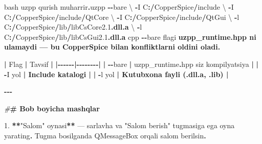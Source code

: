 \documentclass[a4paper,11pt,twoside,openright]{book}
\newenvironment{Shaded}{\begin{snugshade}}{\end{snugshade}}
\newcommand{\CharTok}[1]{\textcolor[rgb]{0.31,0.60,0.02}{#1}}
\newcommand{\ErrorTok}[1]{\textcolor[rgb]{0.64,0.00,0.00}{\textbf{#1}}}
\newcommand{\FloatTok}[1]{\textcolor[rgb]{0.00,0.00,0.81}{#1}}
\newcommand{\NormalTok}[1]{#1}
\newcommand{\OperatorTok}[1]{\textcolor[rgb]{0.81,0.36,0.00}{\textbf{#1}}}
\newcommand{\PreprocessorTok}[1]{\textcolor[rgb]{0.56,0.35,0.01}{\textit{#1}}}
\newcommand{\StringTok}[1]{\textcolor[rgb]{0.31,0.60,0.02}{#1}}
\begin{document}
\begin{Shaded}
\begin{Highlighting}[]
\ErrorTok{\textasciigrave{}\textasciigrave{}\textasciigrave{}}\NormalTok{bash}
\NormalTok{uzpp qurish muharrir}\OperatorTok{.}\NormalTok{uzpp }\OperatorTok{{-}{-}}\NormalTok{bare \textbackslash{}}
  \OperatorTok{{-}}\NormalTok{I C}\OperatorTok{:/}\NormalTok{CopperSpice}\OperatorTok{/}\NormalTok{include \textbackslash{}}
  \OperatorTok{{-}}\NormalTok{I C}\OperatorTok{:/}\NormalTok{CopperSpice}\OperatorTok{/}\NormalTok{include}\OperatorTok{/}\NormalTok{QtCore \textbackslash{}}
  \OperatorTok{{-}}\NormalTok{I C}\OperatorTok{:/}\NormalTok{CopperSpice}\OperatorTok{/}\NormalTok{include}\OperatorTok{/}\NormalTok{QtGui \textbackslash{}}
  \OperatorTok{{-}}\NormalTok{l C}\OperatorTok{:/}\NormalTok{CopperSpice}\OperatorTok{/}\NormalTok{lib}\OperatorTok{/}\NormalTok{libCsCore2}\FloatTok{.1}\ErrorTok{.dll.a}\NormalTok{ \textbackslash{}}
  \OperatorTok{{-}}\NormalTok{l C}\OperatorTok{:/}\NormalTok{CopperSpice}\OperatorTok{/}\NormalTok{lib}\OperatorTok{/}\NormalTok{libCsGui2}\FloatTok{.1}\ErrorTok{.dll.a}
\ErrorTok{\textasciigrave{}\textasciigrave{}\textasciigrave{}}\NormalTok{cpp}
\ErrorTok{\textasciigrave{}}\OperatorTok{{-}{-}}\NormalTok{bare}\ErrorTok{\textasciigrave{}}\NormalTok{ flag}\CharTok{\textquotesingle{}i}\ErrorTok{ \textasciigrave{}uzpp\_runtime.hpp\textasciigrave{} ni ulamaydi — bu CopperSpice bilan konfliktlarni oldini oladi.}

\OperatorTok{|}\NormalTok{ Flag }\OperatorTok{|}\NormalTok{ Tavsif }\OperatorTok{|}
\OperatorTok{|{-}{-}{-}{-}{-}{-}|{-}{-}{-}{-}{-}{-}{-}{-}|}
\OperatorTok{|} \ErrorTok{\textasciigrave{}}\OperatorTok{{-}{-}}\NormalTok{bare}\ErrorTok{\textasciigrave{}} \OperatorTok{|} \ErrorTok{\textasciigrave{}}\NormalTok{uzpp\_runtime}\OperatorTok{.}\NormalTok{hpp}\ErrorTok{\textasciigrave{}}\NormalTok{ siz kompilyatsiya }\OperatorTok{|}
\OperatorTok{|} \ErrorTok{\textasciigrave{}}\OperatorTok{{-}}\NormalTok{I yo}\CharTok{\textquotesingle{}l}\ErrorTok{\textasciigrave{} | Include katalogi |}
\OperatorTok{|} \ErrorTok{\textasciigrave{}}\OperatorTok{{-}}\NormalTok{l yo}\CharTok{\textquotesingle{}l}\ErrorTok{\textasciigrave{} | Kutubxona fayli (\textasciigrave{}.dll.a\textasciigrave{}, \textasciigrave{}.lib\textasciigrave{}) |}

\OperatorTok{{-}{-}{-}}

\PreprocessorTok{\#}\ErrorTok{\# Bob bo\textquotesingle{}yicha mashqlar}

\FloatTok{1.} \OperatorTok{**}\StringTok{"Salom"}\NormalTok{ oynasi}\OperatorTok{**}\NormalTok{ — sarlavha va }\StringTok{"Salom berish"}\NormalTok{ tugmasiga ega oyna yarating}\OperatorTok{.}\NormalTok{ Tugma bosilganda }\ErrorTok{\textasciigrave{}}\NormalTok{QMessageBox}\ErrorTok{\textasciigrave{}}\NormalTok{ orqali salom berilsin}\OperatorTok{.}


\end{Highlighting}
\end{Shaded}
\end{document}
